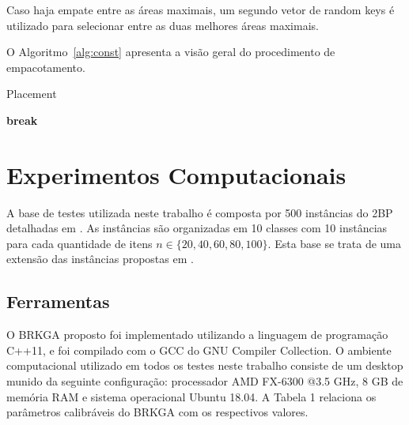 \documentclass[article]{rian_article}
\begin{document}
Caso haja empate entre as áreas maximais, um segundo vetor de random keys é utilizado para selecionar entre as duas melhores áreas maximais.


O Algoritmo~\ref{alg:const} apresenta a visão geral do procedimento de empacotamento.

\begin{algorithm}[hbtp]
\caption{Placement}
\label{alg:const}
\begin{algorithmic}[1]
\footnotesize
{}
				\State \textbf{break}
			\EndIf
		\EndFor
		\Else
		\EndIf
	\EndFor
\EndProcedure
\end{algorithmic}
\end{algorithm}

\section{Experimentos Computacionais}
A base de testes utilizada neste trabalho é composta por 500 instâncias do 2BP detalhadas em \citet{martello1998}. As instâncias são organizadas em 10 classes com 10 instâncias para cada quantidade de itens ${n} \in \{20, 40, 60, 80, 100\}$. Esta base se trata de uma extensão das instâncias propostas em \citet{wang1987}.

\subsection{Ferramentas}\label{sec::ferramentas}

O BRKGA proposto foi implementado utilizando a linguagem de programação C++11, e foi compilado com o GCC do GNU Compiler Collection. O ambiente computacional utilizado em todos os testes neste trabalho consiste de um desktop munido da seguinte configuração: processador AMD FX-6300 @3.5 GHz, 8 GB de memória RAM e sistema operacional Ubuntu 18.04. A Tabela 1 relaciona os parâmetros calibráveis do BRKGA com os respectivos valores.
\end{document}
